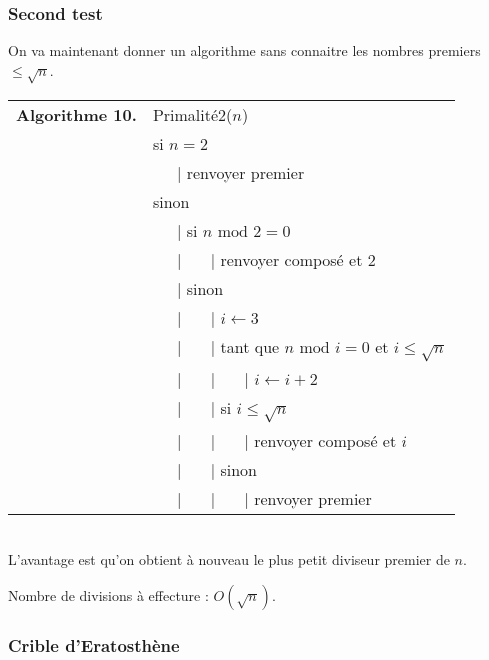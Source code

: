\documentclass[12pt]{report}
\begin{document}
\subsubsection*{Second test}

On va maintenant donner un algorithme sans connaitre les nombres premiers $\leq \sqrt{n}$.   \\

\begin{tabular}{ll}
\textbf{Algorithme 10.} & Primalité2($n$)\\
           & si $n=2$ \\
           & \ \ \ {\rm | } renvoyer premier  \\
           & sinon \\
           & \ \ \ {\rm | } si $n \text{ mod }2  =0 $ \\
           & \ \ \ {\rm |} \ \ \ {\rm |} renvoyer composé et 2 \\
           & \ \ \ {\rm |} sinon  \\
           & \ \ \ {\rm |} \ \ \ {\rm |}   $i \leftarrow 3$ \\
           & \ \ \ {\rm |} \ \ \ {\rm |} tant que $ n \text{ mod }  i =0$ et $i \leq \sqrt{n}$  \\
           & \ \ \ {\rm |} \ \ \ {\rm |} \ \ \ {\rm |}  $ i \leftarrow i+2$\\
           & \ \ \ {\rm |} \ \ \ {\rm |} si $i \leq \sqrt{n} $ \\
           & \ \ \ {\rm |} \ \ \ {\rm |} \ \ \ {\rm |} renvoyer composé et $i$ \\
           & \ \ \ {\rm |} \ \ \ {\rm |} sinon  \\
           & \ \ \ {\rm |} \ \ \ {\rm |} \ \ \ {\rm |}   renvoyer premier  
\end{tabular}\\

L'avantage est qu'on obtient à nouveau le plus petit diviseur premier de $n$. \par 
Nombre de divisions à effecture : $O(\sqrt{n})$.

\subsubsection*{Crible d'Eratosthène}
\end{document}

